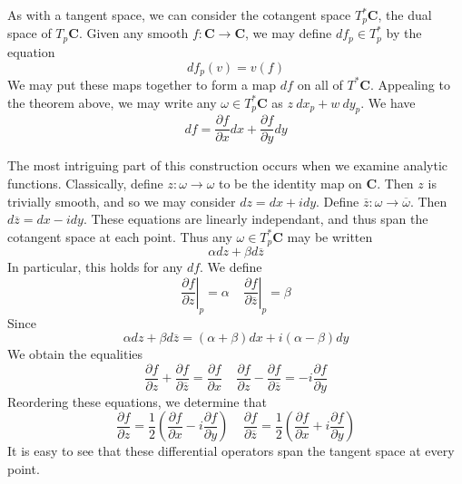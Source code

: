 As with a tangent space, we can consider the cotangent space $T_p^* \mathbf{C}$, the dual space of $T_p \mathbf{C}$. Given any smooth $f: \mathbf{C} \to \mathbf{C}$, we may define $df_p \in T_p^*$ by the equation
%
\[ df_p (v) = v(f) \]
%
We may put these maps together to form a map $df$ on all of $T^* \mathbf{C}$. Appealing to the theorem above, we may write any $\omega \in T_p^* \mathbf{C}$ as $z\ dx_p + w\ dy_p$. 
%
We have
%
\[ df = \frac{\partial f}{\partial x} dx + \frac{\partial f}{\partial y} dy \]

The most intriguing part of this construction occurs when we examine analytic functions. Classically, define $z: \omega \to \omega$ to be the identity map on $\mathbf{C}$. Then $z$ is trivially smooth, and so we may consider $dz = dx + i dy$. Define $\overline{z} : \omega \to \overline{\omega}$. Then $d\overline{z} = dx - i dy$. These equations are linearly independant, and thus span the cotangent space at each point. Thus any $\omega \in T_p^* \mathbf{C}$ may be written
%
\[ \alpha dz + \beta d\overline{z} \]
%
In particular, this holds for any $df$. We define
%
\[ \left.\frac{\partial f}{\partial z}\right|_p = \alpha\ \ \ \ \ \left.\frac{\partial f}{\partial \overline{z}}\right|_p = \beta \]
%
Since
%
\[ \alpha dz + \beta d\overline{z} = (\alpha + \beta) dx + i(\alpha - \beta) dy \]
%
We obtain the equalities
%
\[ \frac{\partial f}{\partial z} + \frac{\partial f}{\partial \overline{z}} = \frac{\partial f}{\partial x}\ \ \ \ \ \frac{\partial f}{\partial z} - \frac{\partial f}{\partial \overline{z}} = -i \frac{\partial f}{\partial y} \]
%
Reordering these equations, we determine that
%
\[ \frac{\partial f}{\partial z} = \frac{1}{2} \left( \frac{\partial f}{\partial x} - i \frac{\partial f}{\partial y} \right)\ \ \ \ \ \frac{\partial f}{\partial \overline{z}} = \frac{1}{2} \left( \frac{\partial f}{\partial x} + i \frac{\partial f}{\partial y} \right) \]
%
It is easy to see that these differential operators span the tangent space at every point.


